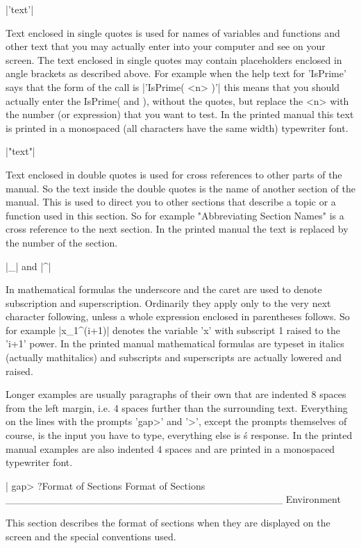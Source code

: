 |'text'|

Text  enclosed  in single  quotes  is used  for  names of  variables  and
functions and other  text that you may actually enter into  your computer
and see on  your  screen.  The text enclosed in single quotes may contain
placeholders enclosed in angle brackets as described above.   For example
when the  help  text  for 'IsPrime'  says  that the form of  the  call is
|'IsPrime( <n> )'| this means that you should actually enter the IsPrime(
and  ),  without the  quotes,  but  replace the  <n> with the  number (or
expression) that  you  want  to test.  In the printed manual this text is
printed in a monospaced  (all characters have  the same width) typewriter
font.

|"text"|

Text enclosed  in  double  quotes  is  used for cross references to other
parts of the manual.  So the text inside the double quotes is the name of
another  section of  the manual.  This is  used  to  direct you  to other
sections that describe a topic or  a  function used  in this section.  So
for example "Abbreviating Section Names" is a cross reference to the next
section.  In the printed manual the text is replaced by the number of the
section.

|_| and |^|

In mathematical formulas the underscore and  the caret are used to denote
subscription  and superscription.  Ordinarily they apply only to the very
next  character  following,   unless  a   whole  expression  enclosed  in
parentheses follows.  So for example |x_1^(i+1)| denotes the variable 'x'
with  subscript  1 raised  to the  'i+1'  power.  In  the  printed manual
mathematical  formulas are typeset in italics (actually mathitalics)  and
subscripts and superscripts are actually lowered and raised.

Longer examples are usually  paragraphs of their  own that are indented 8
spaces from the left margin, i.e.  4 spaces further than  the surrounding
text.  Everything  on the lines with  the prompts 'gap>' and '>',  except
the  prompts  themselves  of course,  is the  input  you  have  to  type,
everything else is {\GAP}\'s response.   In the printed  manual  examples
are also indented 4 spaces  and are  printed  in  a monospaced typewriter
font.

|    gap> ?Format of Sections
    Format of Sections ______________________________________ Environment

    This section describes the format of sections when they are displayed
    on the screen and the special conventions used.

